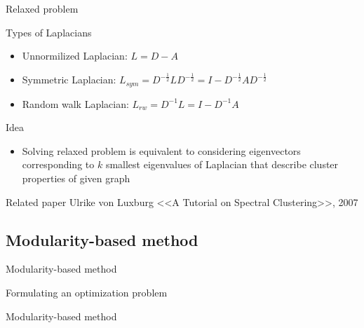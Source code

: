 \documentclass{beamer}
\theoremstyle{definition}
\theoremstyle{plain}
\theoremstyle{remark}
\begin{document}
		 	\begin{frame}{Relaxed problem}
				\begin{block}{Types of Laplacians}
					\begin{itemize}
						\item Unnormilized Laplacian: $L=D-A$
						\item Symmetric Laplacian: $L_{sym} =D^{-\frac{1}{2}}LD^{-\frac{1}{2}}=I-D^{-\frac{1}{2}}AD^{-\frac{1}{2}}$
						\item Random walk Laplacian: $L_{rw} =D^{-1}L=I-D^{-1}A$
					\end{itemize}
				\end{block}
				\begin{block}{Idea}
					\begin{itemize}
						\item Solving relaxed problem is equivalent to considering eigenvectors corresponding to $k$ smallest eigenvalues of Laplacian that describe cluster properties of given graph
					\end{itemize}
				\end{block}
				\begin{block}{Related paper}
					Ulrike von Luxburg <<A Tutorial on Spectral Clustering>>, 2007
				\end{block}
			\end{frame}	

		\subsection{Modularity-based method}
			\begin{frame}{Modularity-based method}
				\begin{block}{Formulating an optimization problem}
				\end{block}
			\end{frame}

			\begin{frame}{Modularity-based method}
				
			\end{frame}
	
\end{document}

